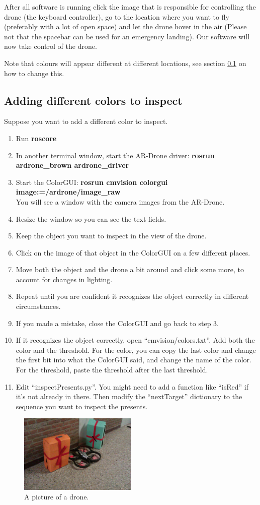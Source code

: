 \documentclass[a4paper,10pt]{article}
\begin{document}
After all software is running click the image that is responsible for controlling the drone (the keyboard controller), go to the location where you want to fly (preferably with a lot of open space) and let the drone hover in the air (Please not that the spacebar can be used for an emergency landing).
Our software will now take control of the drone. 

Note that colours will appear different at different locations, see section \ref{sec:changecolour} on how to change this. 

\subsection{Adding different colors to inspect}
\label{sec:changecolour}
Suppose you want to add a different color to inspect.
\begin{enumerate}
\item Run \textbf{roscore}
\item In another terminal window, start the AR-Drone driver: \textbf{rosrun ardrone\_brown ardrone\_driver}
\item Start the ColorGUI: \textbf{rosrun cmvision colorgui image:=/ardrone/image\_raw} \\
      You will see a window with the camera images from the AR-Drone.
\item Resize the window so you can see the text fields.
\item Keep the object you want to inspect in the view of the drone.
\item Click on the image of that object in the ColorGUI on a few different places.
\item Move both the object and the drone a bit around and click some more, to account for changes in lighting.
\item Repeat until you are confident it recognizes the object correctly in different circumstances.
\item If you made a mistake, close the ColorGUI and go back to step 3.
\item If it recognizes the object correctly, open ``cmvision/colors.txt''. Add both the color and the threshold. For the color, you can copy the last color and change the first bit into what the ColorGUI said, and change the name of the color. For the threshold, paste the threshold after the last threshold.
\item Edit ``inspectPresents.py''. You might need to add a function like ``isRed'' if it's not already in there. Then modify the ``nextTarget'' dictionary to the sequence you want to inspect the presents.
\end{enumerate}

\begin{figure}[h!]
	\caption{A picture of a drone.}
	\centering
	\includegraphics[width=0.5\textwidth]{images/presentsAndDrone}
\end{figure}
\end{document}
